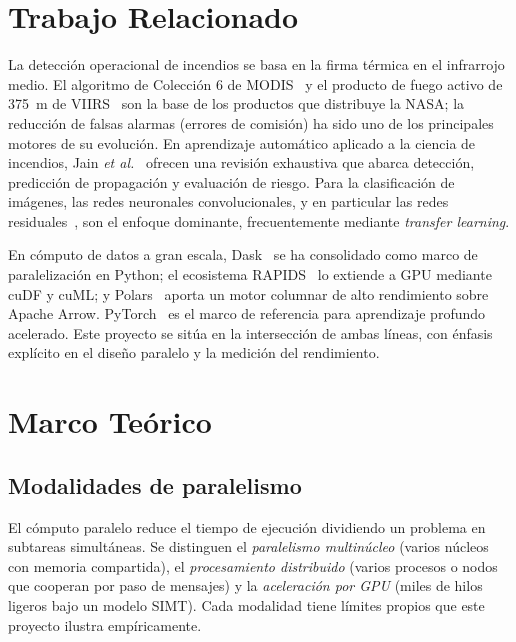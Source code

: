 \documentclass[conference]{IEEEtran}
\begin{document}
\section{Trabajo Relacionado}
\label{sec:related}
La detección operacional de incendios se basa en la firma térmica en el infrarrojo medio. El algoritmo de Colección 6 de MODIS~\cite{giglio2016} y el producto de fuego activo de 375~m de VIIRS~\cite{schroeder2014} son la base de los productos que distribuye la NASA; la reducción de falsas alarmas (errores de comisión) ha sido uno de los principales motores de su evolución. En aprendizaje automático aplicado a la ciencia de incendios, Jain \textit{et al.}~\cite{jain2020} ofrecen una revisión exhaustiva que abarca detección, predicción de propagación y evaluación de riesgo. Para la clasificación de imágenes, las redes neuronales convolucionales, y en particular las redes residuales~\cite{he2016}, son el enfoque dominante, frecuentemente mediante \textit{transfer learning}.

En cómputo de datos a gran escala, Dask~\cite{rocklin2015} se ha consolidado como marco de paralelización en Python; el ecosistema RAPIDS~\cite{rapids} lo extiende a GPU mediante cuDF y cuML; y Polars~\cite{polars} aporta un motor columnar de alto rendimiento sobre Apache Arrow. PyTorch~\cite{paszke2019} es el marco de referencia para aprendizaje profundo acelerado. Este proyecto se sitúa en la intersección de ambas líneas, con énfasis explícito en el diseño paralelo y la medición del rendimiento.

\section{Marco Teórico}
\label{sec:marco}
\subsection{Modalidades de paralelismo}
El cómputo paralelo reduce el tiempo de ejecución dividiendo un problema en subtareas simultáneas. Se distinguen el \textit{paralelismo multinúcleo} (varios núcleos con memoria compartida), el \textit{procesamiento distribuido} (varios procesos o nodos que cooperan por paso de mensajes) y la \textit{aceleración por GPU} (miles de hilos ligeros bajo un modelo SIMT). Cada modalidad tiene límites propios que este proyecto ilustra empíricamente.
\end{document}
